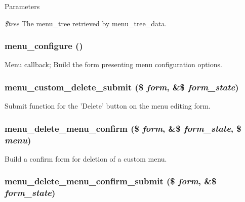 \begin{DoxyParams}{Parameters}
\item[{\em \$tree}]The menu\_\-tree retrieved by menu\_\-tree\_\-data. \end{DoxyParams}
\hypertarget{menu_8admin_8inc_a06edf99d84102336d33cb6fd3201d1ca}{
\subsubsection[{menu\_\-configure}]{\setlength{\rightskip}{0pt plus 5cm}menu\_\-configure ()}}
\label{menu_8admin_8inc_a06edf99d84102336d33cb6fd3201d1ca}
Menu callback; Build the form presenting menu configuration options. \hypertarget{menu_8admin_8inc_abe39d1c961ad32624a0c927ecb9ca611}{
\subsubsection[{menu\_\-custom\_\-delete\_\-submit}]{\setlength{\rightskip}{0pt plus 5cm}menu\_\-custom\_\-delete\_\-submit (\$ {\em form}, \/  \&\$ {\em form\_\-state})}}
\label{menu_8admin_8inc_abe39d1c961ad32624a0c927ecb9ca611}
Submit function for the 'Delete' button on the menu editing form. \hypertarget{menu_8admin_8inc_a3eb24a09e4b37396508e69a9cf3fe789}{
\subsubsection[{menu\_\-delete\_\-menu\_\-confirm}]{\setlength{\rightskip}{0pt plus 5cm}menu\_\-delete\_\-menu\_\-confirm (\$ {\em form}, \/  \&\$ {\em form\_\-state}, \/  \$ {\em menu})}}
\label{menu_8admin_8inc_a3eb24a09e4b37396508e69a9cf3fe789}
Build a confirm form for deletion of a custom menu. \hypertarget{menu_8admin_8inc_a072747a64b798d6967fbf81e046a5475}{
\subsubsection[{menu\_\-delete\_\-menu\_\-confirm\_\-submit}]{\setlength{\rightskip}{0pt plus 5cm}menu\_\-delete\_\-menu\_\-confirm\_\-submit (\$ {\em form}, \/  \&\$ {\em form\_\-state})}}

